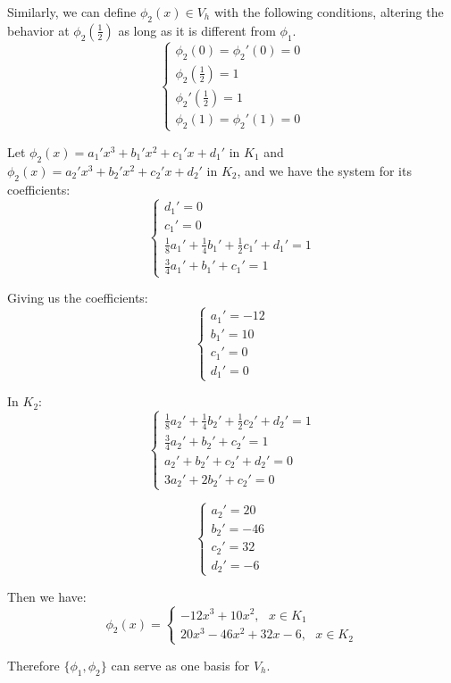 \documentclass[12pt]{article} %
\begin{document}
Similarly, we can define $\phi_2(x)\in V_h$ with the following conditions, altering the behavior at $\phi_2(\frac12)$ as long as it is different from $\phi_1$.
$$
	\begin{cases}
		\phi_2(0) = \phi_2'(0) = 0\\
		\phi_2(\frac12) = 1\\
		\phi_2'(\frac12) = 1\\
		\phi_{2}(1) = \phi_2'(1) = 0	
	\end{cases}
$$

Let $\phi_2(x) = a_1'x^3 + b_1'x^2 + c_1'x + d_1'$ in $K_1$ and $\phi_2(x) = a_2'x^3 + b_2'x^2 + c_2'x + d_2'$ in $K_2$, and we have the system for its coefficients:
$$
	\begin{cases}
		d_1' = 0\\
		c_1' = 0\\
		\frac18 a_1' + \frac14 b_1' + \frac12 c_1' + d_1' = 1\\
		\frac34 a_1' + b_1' + c_1' = 1
	\end{cases}
$$

Giving us the coefficients:
$$
	\begin{cases}
		a_1' = -12\\
		b_1' = 10\\
		c_1' = 0\\
		d_1' = 0
	\end{cases}
$$

In $K_2$:
$$
	\begin{cases}
		\frac18 a_2' + \frac14 b_2' + \frac12 c_2' + d_2' = 1 \\
		\frac34 a_2' + b_2' + c_2' = 1 \\
		a_2' + b_2' + c_2' + d_2' = 0\\
		3a_2' + 2b_2' + c_2' = 0
	\end{cases}
$$

$$
	\begin{cases}
		a_2' = 20\\
		b_2'= -46\\
		c_2' = 32\\
		d_2' = -6
	\end{cases}
$$

Then we have:
$$
	\phi_2(x) = 
	\begin{cases}
		-12x^3 + 10x^2, \text{ $x \in K_1$}\\
		20x^3 -46x^2 + 32x - 6, \text{ $x\in K_2$}
	\end{cases}
$$


Therefore $\{\phi_1,\phi_2\}$ can serve as one basis for $V_h$.
\end{document}
